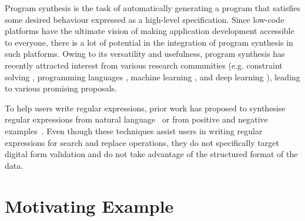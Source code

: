Program synthesis is the task of automatically generating a program that satisfies some desired behaviour expressed as a high-level specification.
Since low-code platforms have the ultimate vision of making application development accessible to everyone, there is a lot of potential in the integration of program synthesis in such platforms.
Owing to its versatility and usefulness, program synthesis has recently attracted interest from various research communities (e.g.
constraint solving \cite{DBLP:conf/ijcai/KolbTPR18,Orvalho19,DBLP:journals/pacmpl/Yaghmazadeh0DD17,UnchartIt20,Regel20,DBLP:conf/tacas/AhmedPA20}, 
programming languages \cite{DBLP:conf/pldi/FengMBD18,DBLP:conf/pldi/FengMGDC17,DBLP:conf/pldi/WangCB17},
machine learning \cite{DBLP:conf/icml/MenonTGLK13,DBLP:conf/ijcai/EllisG17,DBLP:conf/cav/ChenWBDF20},
and deep learning \cite{DBLP:conf/iclr/BalogGBNT17,DBLP:conf/iclr/ParisottoMS0ZK17,DanielThesis,Regel20,DBLP:conf/naacl/HuangWSYH18}), leading to various promising proposals. %



To help users write regular expressions, prior work has proposed to synthesise regular expressions from natural language~\cite{Regel20,DBLP:conf/naacl/KushmanB13,DBLP:conf/emnlp/LocascioNDKB16,DBLP:conf/emnlp/ZhongGYPXLLZ18,DBLP:journals/pacmpl/Yaghmazadeh0DD17} or from positive and negative examples~\cite{Regel20,DBLP:conf/popl/Gulwani11,AlphaRegex16,Fidex16}. Even though these techniques assist users in writing regular expressions for search and replace operations, they do not specifically target digital form validation and do not take advantage of the structured format of the data.


\section{Motivating Example}\label{sec:motivating-example}

